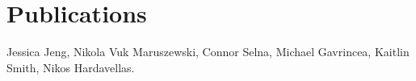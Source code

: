 \section{Publications}

\resumeSubHeadingListStart


\vspace{2pt}

\hspace{12pt}
Jessica Jeng, Nikola Vuk Maruszewski, Connor Selna, Michael Gavrincea, Kaitlin
Smith, Nikos Hardavellas.





\resumeSubHeadingListEnd

